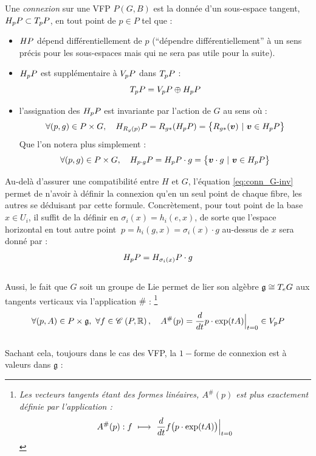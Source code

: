 \begin{definition} \label{def:connexion2VFP}
Une \emph{connexion} sur une VFP $P(G,B)$ est la donnée d'un sous-espace tangent, $\hg[p]{P}\subset \tg[p]{P}$, en tout point de $p\in P$ tel que :
\begin{itemize}
	
	\item $\hg{P}$ dépend différentiellement de $p$ (``dépendre différentiellement'' à un sens précis pour les sous-espaces mais qui ne sera pas utile pour la suite).
	
	\item $\hg[p]{P}$ est supplémentaire à $\vg[p]{P}$ dans $\tg[p]{P}$ :
	\begin{equation}\label{eq:TP=V+H}
		\tg[p]{P} = \vg[p]{P} \oplus \hg[p]{P}
	\end{equation}
	
	\item l'assignation des $\hg[p]{P}$ est invariante par l'action de $G$ au sens où :
	\begin{equation}\label{eq:conn_G-inv}
		\forall (p,g)\in P\times G,\quad \hg[R_g(p)]{P} = R_{g*} (\hg[p]{P}) = \big\{R_{g*}(\bf{v})\ |\ \bf{v} \in \hg[p]{P} \big\}
	\end{equation}
	Que l'on notera plus simplement :
	\begin{equation}
		\forall (p,g)\in P\times G,\quad \hg[p\cdot g]{P} = \hg[p]{P}\cdot g = \big\{\bf{v}\cdot g\ |\ \bf{v} \in \hg[p]{P} \big\}
	\end{equation}
\end{itemize}
\end{definition}
\skipl

Au-delà d'assurer une compatibilité entre $H$ et $G$, l'équation \eqref{eq:conn_G-inv} permet de n'avoir à définir la connexion qu'en un seul point de chaque fibre, les autres se déduisant par cette formule. 
Concrètement, pour tout point de la base $x\in U_i$, il suffit de la définir en $\sigma_i(x) = h_i(e, x)$, de sorte que l'espace horizontal en tout autre point $\ p=h_i(g, x) = \sigma_i(x)\cdot g$ au-dessus de $x$ sera donné par :
\[\hg[p]{P} = \hg[\sigma_i(x)]{P}\cdot g\]
\\
Aussi, le fait que $G$ soit un groupe de Lie permet de lier son algèbre $\mathfrak{g}\cong \tg[e]{G}$ aux tangents verticaux via l'application $\#$ : \footnote{\itshape 
Les vecteurs tangents étant des formes linéaires, $A^\#(p)$ est plus exactement définie par l'application :
\[A^\#(p) : f\ \lmt\  \frac{d}{dt} f\big( p\cdot \exp(tA) \big)\Big|_{t=0}\]}
\begin{equation} \label{eq:alg2vg}
\forall (p,A)\in P\times \mathfrak{g},\ \forall f\in\conti{P}{\R},\quad A^\#(p) = \frac{d}{dt} p\cdot \exp(tA) \Big|_{t=0}\in\vg[p]{P}
\end{equation}
\\
Sachant cela, toujours dans le cas des VFP, la $1-$forme de connexion est à valeurs dans $\mathfrak{g}$ :

